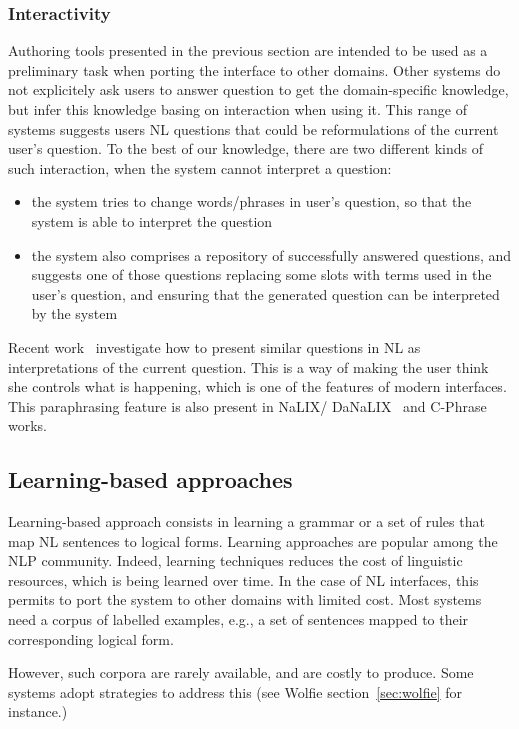 \documentclass[10pt,journal,letterpaper,compsoc]{IEEEtran}
\begin{document}
\subsubsection{Interactivity}
Authoring tools presented in the previous section are intended to be used as a
preliminary task when porting the interface to other domains. 
Other systems do not explicitely ask users to answer question to get the
domain-specific knowledge, but infer this knowledge basing on interaction when
using it. 
This range of systems suggests users NL questions that could be reformulations
of the current user's question. 
To the best of our knowledge, there are two different kinds of such interaction,
when the system cannot interpret a question:
\begin{itemize}
  \item the system tries to change words/phrases in user's question, so that the
  system is able to interpret the question
  \item the system also comprises a repository of successfully answered
  questions, and suggests one of those questions replacing some slots with terms
  used in the user's question, and ensuring that the generated question can be
  interpreted by the system
\end{itemize}
Recent work~\cite{DBLP:conf/icde/KoutrikaSI10} investigate how to present
similar questions in NL as interpretations of the current question. 
This is a way of making the user think she controls what is happening, which is
one of the features of modern interfaces. 
This paraphrasing feature is also present in {\sc NaLIX}/{\sc
DaNaLIX}~\cite{Li:2005:NIN:1066157.1066281,Li:2007:DDN:1247480.1247643} and {\sc
C-Phrase}~\cite{Minock:2010:CSB:1715942.1716190} works.



\subsection{Learning-based approaches}
Learning-based approach consists in learning a grammar or a set of rules that
map NL sentences to logical forms. 
Learning approaches are popular among the NLP community. Indeed, learning
techniques reduces the cost of linguistic resources, which is being learned over
time.
In the case of NL interfaces, this permits to port the system to other domains
with limited cost. 
Most systems need a corpus of labelled examples, e.g., a set of sentences mapped
to their corresponding logical form.

However, such corpora are rarely available, and are costly to produce.
Some systems adopt strategies to address this (see {\sc Wolfie}
section~\ref{sec:wolfie} for instance.)
\end{document}
